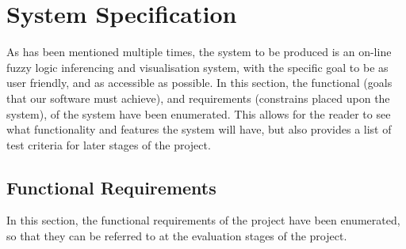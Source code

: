\section{System Specification}
\label{sec:spec}
As has been mentioned multiple times, the system to be produced is an on-line fuzzy logic inferencing and visualisation system, with the specific goal to be as user friendly, and as accessible as possible. In this section, the functional (goals that our software must achieve), and requirements (constrains placed upon the system), of the system have been enumerated. This allows for the reader to see what functionality and features the system will have, but also provides a list of test criteria for later stages of the project.

\subsection{Functional Requirements}

In this section, the functional requirements of the project have been enumerated, so that they can be referred to at the evaluation stages of the project.


